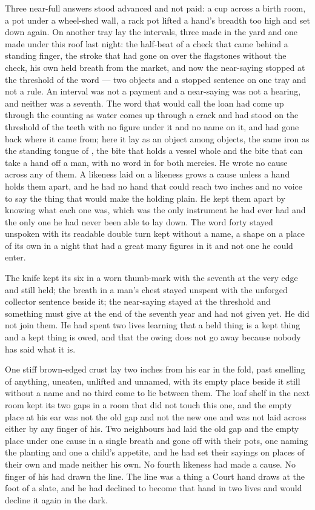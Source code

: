 Three near-full answers stood advanced and not paid: a cup across a birth room, a pot under a wheel-shed wall, a rack pot lifted a hand's breadth too high and set down again. On another tray lay the intervals, three made in the yard and one made under this roof last night: the half-beat of a check that came behind a standing finger, the stroke that had gone on over the flagstones without the check, his own held breath from the market, and now the near-saying stopped at the threshold of the word --- two objects and a stopped sentence on one tray and not a rule. An interval was not a payment and a near-saying was not a hearing, and neither was a seventh. The word that would call the loan had come up through the counting as water comes up through a crack and had stood on the threshold of the teeth with no figure under it and no name on it, and had gone back where it came from; here it lay as an object among objects, the same iron as the standing tongue of , the bite that holds a vessel whole and the bite that can take a hand off a man, with no word in  for both mercies. He wrote no cause across any of them. A likeness laid on a likeness grows a cause unless a hand holds them apart, and he had no hand that could reach two inches and no voice to say the thing that would make the holding plain. He kept them apart by knowing what each one was, which was the only instrument he had ever had and the only one he had never been able to lay down. The word forty stayed unspoken with its readable double turn kept without a name, a shape on a place of its own in a night that had a great many figures in it and not one he could enter.

The knife kept its six in a worn thumb-mark with the seventh at the very edge and still held; the breath in a man's chest stayed unspent with the unforged collector sentence beside it; the near-saying stayed at the threshold and something must give at the end of the seventh year and had not given yet. He did not join them. He had spent two lives learning that a held thing is a kept thing and a kept thing is owed, and that the owing does not go away because nobody has said what it is.

\scenebreak

One stiff brown-edged crust lay two inches from his ear in the fold, past smelling of anything, uneaten, unlifted and unnamed, with its empty place beside it still without a name and no third come to lie between them. The loaf shelf in the next room kept its two gaps in a room that did not touch this one, and the empty place at his ear was not the old gap and not the new one and was not laid across either by any finger of his. Two neighbours had laid the old gap and the empty place under one cause in a single breath and gone off with their pots, one naming the planting and one a child's appetite, and he had set their sayings on places of their own and made neither his own. No fourth likeness had made a cause. No finger of his had drawn the line. The line was a thing a Court hand draws at the foot of a slate, and he had declined to become that hand in two lives and would decline it again in the dark.

